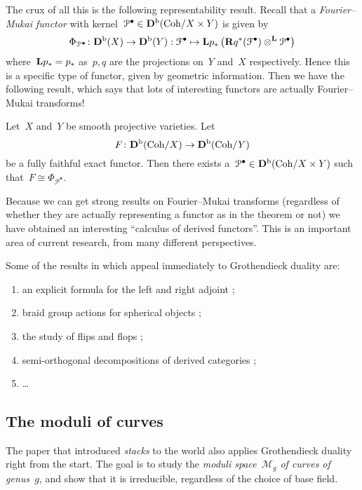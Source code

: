 The crux of all this is the following representability result. Recall that a \emph{Fourier--Mukai functor} with kernel~$\mathcal{P}^\bullet\in\mathbf{D}^{\mathrm{b}}(\mathrm{Coh}/X\times Y)$ is given by
\begin{equation}
  \Phi_{\mathcal{P}^\bullet}\colon\mathbf{D}^{\mathrm{b}}(X)\to\mathbf{D}^{\mathrm{b}}(Y):\mathcal{F}^\bullet\mapsto\mathbf{L} p_*\left( \mathbf{R} q^*(\mathcal{F}^\bullet)\otimes^{\mathbf{L}}\mathcal{P}^\bullet \right)
\end{equation}
where~$\mathbf{L} p_*=p_*$ as~$p,q$ are the projections on~$Y$ and~$X$ respectively. Hence this is a specific type of functor, given by geometric information. Then we have the following result, which says that lots of interesting functors are actually Fourier--Mukai transforms!
\begin{theorem}
  \label{theorem:bondal-orlov}
  Let~$X$ and~$Y$ be smooth projective varieties. Let
  \begin{equation}
    F\colon\mathbf{D}^{\mathrm{b}}(\mathrm{Coh}/X)\to\mathbf{D}^{\mathrm{b}}(\mathrm{Coh}/Y)
  \end{equation}
  be a fully faithful exact functor. Then there exists a~$\mathcal{P}^\bullet\in\mathbf{D}^{\mathrm{b}}(\mathrm{Coh}/X\times Y)$ such that~$F\cong\Phi_{\mathcal{P}^\bullet}$.
\end{theorem}
Because we can get strong results on Fourier--Mukai transforms (regardless of whether they are actually representing a functor as in the theorem or not) we have obtained an interesting ``calculus of derived functors''. This is an important area of current research, from many different perspectives.

Some of the results in \cite{huybrechts-fourier-mukai-transforms} which appeal immediately to Grothendieck duality are:
\begin{enumerate}
  \item an explicit formula for the left and right adjoint \cite[proposition 5.9]{huybrechts-fourier-mukai-transforms};
  \item braid group actions for spherical objects \cite[lemma 8.21]{huybrechts-fourier-mukai-transforms};
  \item the study of flips and flops \cite[\S 11.1]{huybrechts-fourier-mukai-transforms};
  \item semi-orthogonal decompositions of derived categories \cite[\S 11.2]{huybrechts-fourier-mukai-transforms};
  \item \ldots
\end{enumerate}


\subsection{The moduli of curves}
The paper that introduced \emph{stacks} to the world \cite{deligne-mumford-irreducibility-moduli-of-curves} also applies Grothendieck duality right from the start. The goal is to study the \emph{moduli space~$\mathcal{M}_g$ of curves of genus~$g$}, and show that it is irreducible, regardless of the choice of base field.

